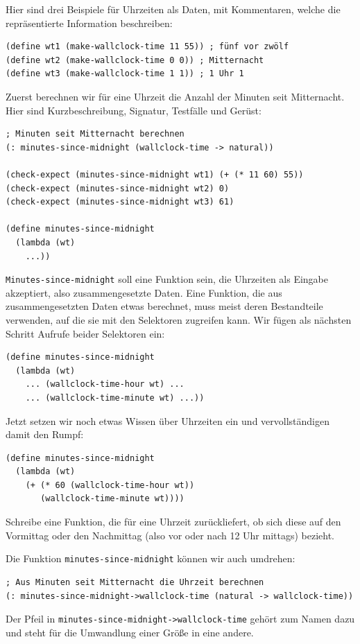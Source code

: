 Hier sind drei Beispiele für Uhrzeiten als Daten, mit Kommentaren,
welche die repräsentierte Information beschreiben:
%
\begin{lstlisting}
(define wt1 (make-wallclock-time 11 55)) ; fünf vor zwölf
(define wt2 (make-wallclock-time 0 0)) ; Mitternacht
(define wt3 (make-wallclock-time 1 1)) ; 1 Uhr 1
\end{lstlisting}
%
Zuerst berechnen wir für eine Uhrzeit die Anzahl der Minuten
seit Mitternacht.  Hier sind Kurzbeschreibung, Signatur, Testfälle und Gerüst:
%
\begin{lstlisting}
; Minuten seit Mitternacht berechnen
(: minutes-since-midnight (wallclock-time -> natural))

(check-expect (minutes-since-midnight wt1) (+ (* 11 60) 55))
(check-expect (minutes-since-midnight wt2) 0)
(check-expect (minutes-since-midnight wt3) 61)

(define minutes-since-midnight
  (lambda (wt)
    ...))
\end{lstlisting}
%
\lstinline{Minutes-since-midnight} soll eine Funktion sein, die
Uhrzeiten als Eingabe akzeptiert, also zusammengesetzte Daten.  Eine
Funktion, die aus zusammengesetzten Daten etwas berechnet, muss meist
deren Bestandteile verwenden, auf die sie mit den Selektoren zugreifen
kann.  Wir fügen als nächsten Schritt Aufrufe beider Selektoren ein:
%
\begin{lstlisting}
(define minutes-since-midnight
  (lambda (wt)
    ... (wallclock-time-hour wt) ...
    ... (wallclock-time-minute wt) ...))
\end{lstlisting}
%
Jetzt setzen wir noch etwas Wissen über Uhrzeiten ein und
vervollständigen damit den Rumpf:
%
\begin{lstlisting}
(define minutes-since-midnight
  (lambda (wt)
    (+ (* 60 (wallclock-time-hour wt))
       (wallclock-time-minute wt))))
\end{lstlisting}
%
\begin{aufgabeinline}
  Schreibe eine Funktion, die für eine Uhrzeit zurückliefert, ob sich
  diese auf den Vormittag oder den Nachmittag (also vor oder nach 12 Uhr
  mittags) bezieht.
\end{aufgabeinline}
%
Die Funktion \lstinline{minutes-since-midnight} können wir auch umdrehen:
%
\begin{lstlisting}
; Aus Minuten seit Mitternacht die Uhrzeit berechnen
(: minutes-since-midnight->wallclock-time (natural -> wallclock-time))
\end{lstlisting}
%
Der Pfeil in \lstinline{minutes-since-midnight->wallclock-time} gehört zum Namen dazu und steht für die Umwandlung
einer Größe in eine andere.

